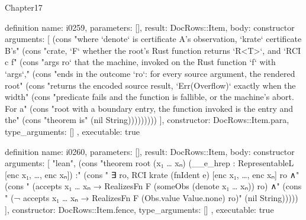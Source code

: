 \begin{lexlean}{Chapter17}
\begin{semanticmodule}
definition{
  name: i0259,
  parameters: [],
  result: DocRows::Item,
  body: constructor{
    arguments: [
      (cons "where `denote` is certificate A's observation, `krate` certificate B's" (cons "crate, `F` whether the root's Rust function returns `R<T>`, and `RCI c f" (cons "args ro` that the machine, invoked on the Rust function `f` with `args`," (cons "ends in the outcome `ro`: for every source argument, the rendered root" (cons "returns the encoded source result, `Err(Overflow)` exactly when the width" (cons "predicate fails and the function is fallible, or the machine's abort. For a" (cons "root with a boundary entry, the function invoked is the entry and the" (cons "theorem is" (nil String)))))))))
    ],
    constructor: DocRows::Item.para,
    type_arguments: []
  },
  executable: true
}

definition{
  name: i0260,
  parameters: [],
  result: DocRows::Item,
  body: constructor{
    arguments: [
      "lean",
      (cons "theorem root (x₁ … xₙ) (__e_hrep : RepresentableL [enc x₁, …, enc xₙ]) :" (cons "    ∃ ro, RCI krate (fnIdent e) [enc x₁, …, enc xₙ] ro ∧" (cons "      (accepts x₁ … xₙ → RealizesFn F (someObs (denote x₁ … xₙ)) ro) ∧" (cons "      (¬ accepts x₁ … xₙ → RealizesFn F (Obs.value Value.none) ro)" (nil String)))))
    ],
    constructor: DocRows::Item.fence,
    type_arguments: []
  },
  executable: true
}


\end{semanticmodule}
\end{lexlean}
